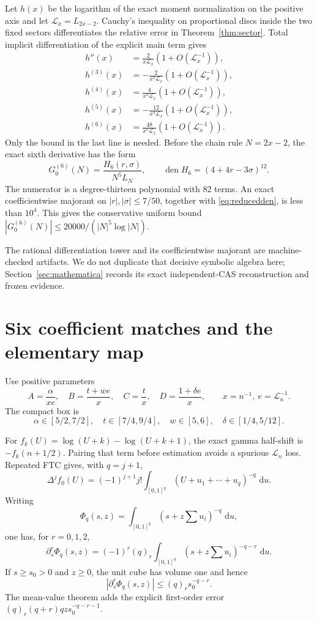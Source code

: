 \documentclass[11pt]{article}
\theoremstyle{definition}
\theoremstyle{remark}
\newcommand{\cL}{\mathcal L}
\newcommand{\dd}{\,\mathrm d}
\begin{document}
Let $h(x)$ be the logarithm of the exact moment normalization on the positive
axis and let $\cL_x=L_{2x-2}$.  Cauchy's inequality on proportional discs
inside the two fixed sectors differentiates the relative error in
Theorem~\ref{thm:sector}.  Total implicit differentiation of the explicit
main term gives
\begin{align}
 h''(x)&=\frac{2}{x\cL_x}(1+O(\cL_x^{-1})),\nonumber\\
 h^{(3)}(x)&=-\frac{2}{x^2\cL_x}(1+O(\cL_x^{-1})),\nonumber\\
 h^{(4)}(x)&=\frac{4}{x^3\cL_x}(1+O(\cL_x^{-1})),\label{eq:tower}\\
 h^{(5)}(x)&=-\frac{12}{x^4\cL_x}(1+O(\cL_x^{-1})),\nonumber\\
 h^{(6)}(x)&=\frac{48}{x^5\cL_x}(1+O(\cL_x^{-1})).\nonumber
\end{align}
Only the bound in the last line is needed.  Before the chain rule $N=2x-2$,
the exact sixth derivative has the form
\[
 G_0^{(6)}(N)=\frac{H_6(r,\sigma)}{N^5L_N},
 \qquad \operatorname{den}H_6=(4+4r-3\sigma)^{12}.
\]
The numerator is a degree-thirteen polynomial with 82 terms.  An exact
coefficientwise majorant on $|r|,|\sigma|\le7/50$, together with
\eqref{eq:reducedden}, is less than $10^4$.  This gives the conservative
uniform bound $|G_0^{(6)}(N)|\le 20000/(|N|^5\log|N|)$.

The rational differentiation tower and its coefficientwise majorant are
machine-checked artifacts.  We do not duplicate that decisive symbolic
algebra here; Section~\ref{sec:mathematica} records its exact independent-CAS
reconstruction and frozen evidence.

\section{Six coefficient matches and the elementary map}\label{sec:model}

Use positive parameters
\[
 A=\frac{\alpha}{xe},\quad B=\frac{t+we}{x},\quad
 C=\frac{t}{x},\quad D=\frac{1+\delta e}{x},
 \qquad x=n^{-1},\ e=\cL_n^{-1}.
\]
The compact box is
\[
 \alpha\in[5/2,7/2],\quad t\in[7/4,9/4],\quad
 w\in[5,6],\quad\delta\in[1/4,5/12].
\]

For $f_k(U)=\log(U+k)-\log(U+k+1)$, the exact gamma half-shift is
$-f_k(n+1/2)$.  Pairing that term before estimation avoids a spurious
$\cL_n$ loss.  Repeated FTC gives, with $q=j+1$,
\[
 \Delta^jf_0(U)=(-1)^{j+1}j!
 \int_{[0,1]^q}(U+u_1+\cdots+u_q)^{-q}\,\dd u.
\]
Writing
\[
 \Phi_q(s,z)=\int_{[0,1]^q}
 (s+z\textstyle\sum u_i)^{-q}\,\dd u,
\]
one has, for $r=0,1,2$,
\[
 \partial_s^r\Phi_q(s,z)=(-1)^r(q)_r
 \int_{[0,1]^q}(s+z\textstyle\sum u_i)^{-q-r}\,\dd u.
\]
If $s\ge s_0>0$ and $z\ge0$, the unit cube has volume one and hence
\[
 |\partial_s^r\Phi_q(s,z)|\le(q)_r s_0^{-q-r}.
\]
The mean-value theorem adds the explicit first-order error
$(q)_r(q+r)qzs_0^{-q-r-1}$.
\end{document}

